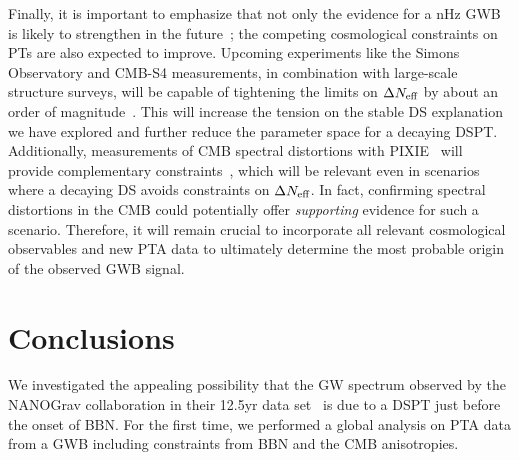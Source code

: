 Finally, it is important to emphasize that not only the evidence for a nHz \ac{GWB} is likely to strengthen in the future~\cite{NANOGrav:2020spf}; the competing cosmological constraints on \acp{PT} are also expected to improve. Upcoming experiments like the  Simons Observatory and \ac{CMB}-S4 measurements, in combination with large-scale structure surveys, will be capable of tightening the limits on $\Delta N_\text{eff} $ by about an order of magnitude~\cite{Abazajian:2019eic, SimonsObservatory:2018koc, Dvorkin:2022jyg}. This will increase the tension on the stable \ac{DS} explanation we have explored and further reduce the parameter space for a decaying \ac{DSPT}. Additionally, measurements of \ac{CMB} spectral distortions with PIXIE~\cite{Chluba:2019nxa} will provide complementary constraints~\cite{Ramberg:2022irf}, which will be relevant even in scenarios where a decaying \ac{DS} avoids constraints on $\Delta N_\text{eff} $. In fact, confirming spectral distortions in the \ac{CMB} could potentially offer \textit{supporting} evidence for such a scenario. Therefore, it will remain crucial to incorporate all relevant cosmological observables and new \ac{PTA} data to ultimately determine the most probable origin of the observed \ac{GWB} signal.

\section{Conclusions}
\label{sec:conclusion}

We investigated the appealing possibility that the \ac{GW} spectrum observed by the \ac{NANOGrav} collaboration in their 12.5yr data set~\cite{NANOGrav:2020bcs} is due to a \ac{DSPT} just before the onset of \ac{BBN}. For the first time, we performed a global analysis on \ac{PTA} data from a \ac{GWB} including constraints from \ac{BBN} and the \ac{CMB} anisotropies.

